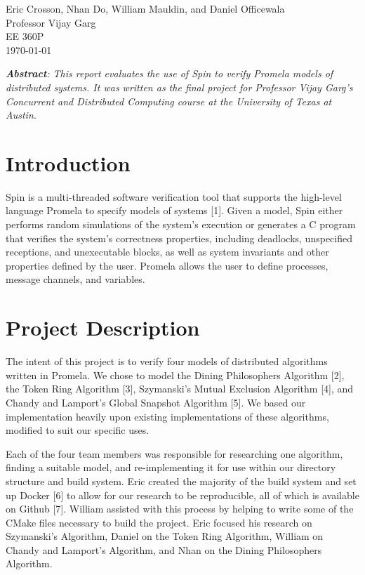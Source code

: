 \documentclass[12pt]{article}
\begin{document}
\begin{flushleft}
Eric Crosson, Nhan Do, William Mauldin, and Daniel Officewala \\
Professor Vijay Garg\\
EE 360P \\
\today \\

\begin{center}
  \emph{\textbf{Abstract}: This report evaluates the use of Spin to verify
    Promela models of distributed systems. It was written as the final project
    for Professor Vijay Garg's Concurrent and Distributed Computing course at
    the University of Texas at Austin.}
\end{center}

\setlength{\parindent}{0.5in}
\section{Introduction}
Spin is a multi-threaded software verification tool that supports the high-level
language Promela to specify models of systems [1]. Given a model, Spin either
performs random simulations of the system's execution or generates a C program
that verifies the system's correctness properties, including deadlocks,
unspecified receptions, and unexecutable blocks, as well as system invariants
and other properties defined by the user. Promela allows the user to define
processes, message channels, and variables.

\section{Project Description}
The intent of this project is to verify four models of distributed algorithms
written in Promela. We chose to model the Dining Philosophers Algorithm [2], the
Token Ring Algorithm [3], Szymanski's Mutual Exclusion Algorithm [4], and Chandy
and Lamport's Global Snapshot Algorithm [5]. We based our implementation heavily
upon existing implementations of these algorithms, modified to suit our specific
uses.

Each of the four team members was responsible for researching one algorithm,
finding a suitable model, and re-implementing it for use within our directory
structure and build system. Eric created the majority of the build system and
set up Docker [6] to allow for our research to be reproducible, all of which is
available on Github [7]. William assisted with this process by helping to write
some of the CMake files necessary to build the project. Eric focused his
research on Szymanski's Algorithm, Daniel on the Token Ring Algorithm, William
on Chandy and Lamport's Algorithm, and Nhan on the Dining Philosophers
Algorithm.


\end{flushleft}
\end{document}

